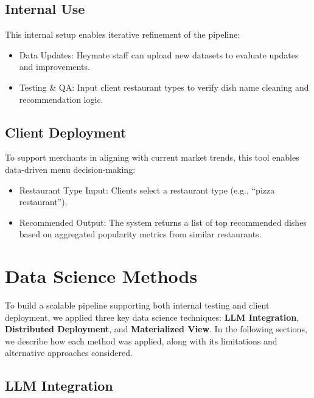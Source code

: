 \documentclass[
  11pt,
  a4paper,
  DIV=11,
  numbers=noendperiod]{scrartcl}
\providecommand{\tightlist}{%
  \setlength{\itemsep}{0pt}\setlength{\parskip}{0pt}}\usepackage{longtable,booktabs,array}
\begin{document}
\subsection{Internal Use}\label{internal-use}

This internal setup enables iterative refinement of the pipeline:

\begin{itemize}
\tightlist
\item
  Data Updates: Heymate staff can upload new datasets to evaluate
  updates and improvements.
\item
  Testing \& QA: Input client restaurant types to verify dish name
  cleaning and recommendation logic.
\end{itemize}

\subsection{Client Deployment}\label{client-deployment}

To support merchants in aligning with current market trends, this tool
enables data-driven menu decision-making:

\begin{itemize}
\tightlist
\item
  Restaurant Type Input: Clients select a restaurant type (e.g., ``pizza
  restaurant'').
\item
  Recommended Output: The system returns a list of top recommended
  dishes based on aggregated popularity metrics from similar
  restaurants.
\end{itemize}

\section{Data Science Methods}\label{data-science-methods}

To build a scalable pipeline supporting both internal testing and client
deployment, we applied three key data science techniques: \textbf{LLM
Integration}, \textbf{Distributed Deployment}, and \textbf{Materialized
View}. In the following sections, we describe how each method was
applied, along with its limitations and alternative approaches
considered.

\subsection{LLM Integration}\label{llm-integration}
\end{document}
